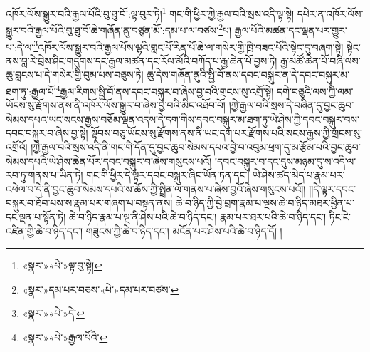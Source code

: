 འཁོར་ལོས་སྒྱུར་བའི་རྒྱལ་པོའི་བུ་ཐུ་བོ་:ལྟ་བུར་ཏེ།\footnote{«སྣར་»«པེ་»ལྟ་བུ་སྟེ།} གང་གི་ཕྱིར་ཀྱེ་རྒྱལ་བའི་སྲས་འདི་ལྟ་སྟེ། དཔེར་ན་འཁོར་ལོས་སྒྱུར་བའི་རྒྱལ་པོའི་བུ་ཐུ་བོ་ཆེ་གཞོན་ནུ་བཙུན་མོ་:དམ་པ་ལ་བཙས་\footnote{«སྣར་»དམ་པར་བཅས་«པེ་»དམ་པར་བཙས་}པ། རྒྱལ་པོའི་མཚན་དང་ལྡན་པར་གྱུར་པ་:དེ་ལ་\footnote{«སྣར་»«པེ་»དེ་}འཁོར་ལོས་སྒྱུར་བའི་རྒྱལ་པོས་ལྷའི་གླང་པོ་རིན་པོ་ཆེ་ལ་གསེར་གྱི་ཁྲི་བཟང་པོའི་སྟེང་དུ་བཞག་སྟེ། སྟེང་ནས་བླ་རེ་བྲེས་ཤིང་གདུགས་དང་རྒྱལ་མཚན་དང་རོལ་མོའི་བཀོད་པ་རྒྱ་ཆེན་པོ་བྱས་ཏེ། རྒྱ་མཚོ་ཆེན་པོ་བཞི་ལས་ཆུ་བླངས་པ་དེ་གསེར་གྱི་བུམ་པས་བཅུས་ཏེ། ཆུ་དེས་གཞོན་ནུའི་སྤྱི་བོ་ནས་དབང་བསྐུར་ན་དེ་དབང་བསྐུར་མ་ཐག་ཏུ་:རྒྱལ་པོ་\footnote{«སྣར་»«པེ་»རྒྱལ་པོའི་}རྒྱལ་རིགས་སྤྱི་བོ་ནས་དབང་བསྐུར་བ་ཞེས་བྱ་བའི་གྲངས་སུ་འགྲོ་སྟེ། དགེ་བཅུའི་ལས་ཀྱི་ལམ་ཡོངས་སུ་རྫོགས་ནས་ནི་འཁོར་ལོས་སྒྱུར་བ་ཞེས་བྱ་བའི་མིང་འཐོབ་བོ། །ཀྱེ་རྒྱལ་བའི་སྲས་དེ་བཞིན་དུ་བྱང་ཆུབ་སེམས་དཔའ་ཡང་སངས་རྒྱས་བཅོམ་ལྡན་འདས་དེ་དག་གིས་དབང་བསྐུར་མ་ཐག་ཏུ་ཡེ་ཤེས་ཀྱི་དབང་བསྐུར་བས་དབང་བསྐུར་བ་ཞེས་བྱ་སྟེ། སྟོབས་བཅུ་ཡོངས་སུ་རྫོགས་ནས་ནི་ཡང་དག་པར་རྫོགས་པའི་སངས་རྒྱས་ཀྱི་གྲངས་སུ་འགྲོའོ། །ཀྱེ་རྒྱལ་བའི་སྲས་འདི་ནི་གང་གི་དོན་དུ་བྱང་ཆུབ་སེམས་དཔའ་བྱེ་བ་འབུམ་ཕྲག་དུ་མ་རྩོམ་པའི་བྱང་ཆུབ་སེམས་དཔའི་ཡེ་ཤེས་ཆེན་པོར་དབང་བསྐུར་བ་ཞེས་གསུངས་པའོ། །དབང་བསྐུར་བ་དང་དུས་མཉམ་དུ་ས་འདི་ལ་རབ་ཏུ་གནས་པ་ཡིན་ཏེ། གང་གི་ཕྱིར་དེ་ལྟར་དབང་བསྐུར་ཞིང་ཡོན་ཏན་དང་། ཡེ་ཤེས་ཚད་མེད་པ་རྣམ་པར་འཕེལ་བ་དེ་ནི་བྱང་ཆུབ་སེམས་དཔའི་ས་ཆོས་ཀྱི་སྤྲིན་ལ་གནས་པ་ཞེས་བྱའོ་ཞེས་གསུངས་པའོ།། །།དེ་ལྟར་དབང་བསྐུར་བ་ཐོབ་པས་ས་རྣམ་པར་གཞག་པ་བསྟན་ནས། ཆེ་བ་ཉིད་ཀྱི་བྱེ་བྲག་རྣམ་པ་ལྔས་ཆེ་བ་ཉིད་མཐར་ཕྱིན་པ་དང་ལྡན་པ་སྟོན་ཏེ། ཆེ་བ་ཉིད་རྣམ་པ་ལྔ་ནི་ཤེས་པའི་ཆེ་བ་ཉིད་དང་། རྣམ་པར་ཐར་པའི་ཆེ་བ་ཉིད་དང་། ཏིང་ངེ་འཛིན་གྱི་ཆེ་བ་ཉིད་དང་། གཟུངས་ཀྱི་ཆེ་བ་ཉིད་དང་། མངོན་པར་ཤེས་པའི་ཆེ་བ་ཉིད་དོ། །
